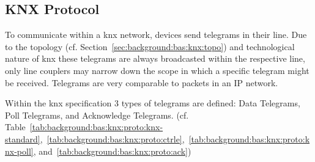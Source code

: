 


\subsection{KNX Protocol}
\label{sec:background:bas:knx:proto}

To communicate within a \gls{knx} network, devices send telegrams in their line. Due to the topology (cf. Section~\ref{sec:background:bas:knx:topo}) and technological nature of \gls{knx} these telegrams are always broadcasted within the respective line, only line couplers may narrow down the scope in which a specific telegram might be received. Telegrams are very comparable to packets in an IP network.

Within the \gls{knx} specification 3 types of telegrams are defined: Data Telegrams, Poll Telegrams, and Acknowledge Telegrams. (cf. Table~\ref{tab:background:bas:knx:proto:knx-standard},~\ref{tab:background:bas:knx:proto:ctrle},~\ref{tab:background:bas:knx:proto:knx-poll}, and~\ref{tab:background:bas:knx:proto:ack})

